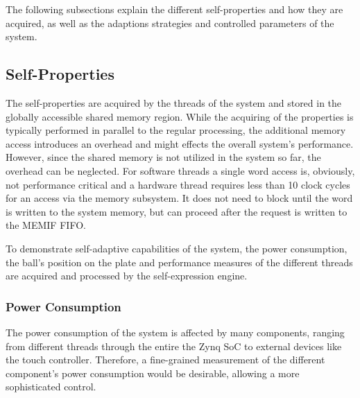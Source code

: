 The following subsections explain the different self-properties and how they
are acquired, as well as the adaptions strategies and controlled parameters of
the system.

\subsection{Self-Properties}

The self-properties are acquired by the threads of the system and stored in
the globally accessible shared memory region. While the acquiring of the
properties is typically performed in parallel to the regular processing, the
additional memory access introduces an overhead and might effects the
overall system's performance. However, since the shared memory is not utilized
in the system so far, the overhead can be neglected. For software threads a
single word access is, obviously, not performance critical and a hardware
thread requires less than 10 clock cycles for an access via the memory
subsystem. It does not need to block until the word is written to the system
memory, but can proceed after the request is written to the \ac{MEMIF}
\ac{FIFO}.

To demonstrate self-adaptive capabilities of the system, the power
consumption, the ball's position on the plate and performance measures of the
different threads are acquired and processed by the self-expression engine.

\subsubsection{Power Consumption}
The power consumption of the system is affected by many components, ranging
from different threads through the entire the Zynq \ac{SoC} to external
devices like the touch controller. Therefore, a fine-grained measurement of
the different component's power consumption would be desirable, allowing a
more sophisticated control.

